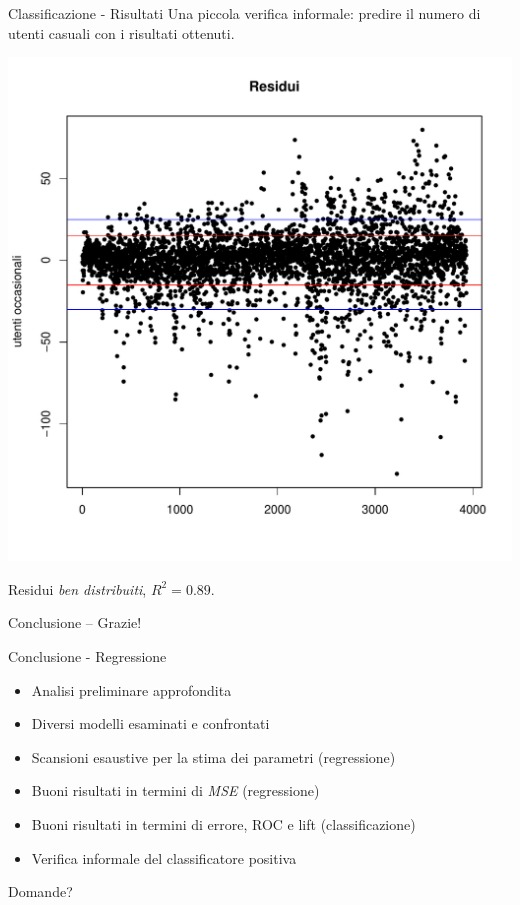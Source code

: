\documentclass{beamer}
\begin{document}
\begin{frame}{Classificazione - Risultati}
Una piccola verifica informale: predire il numero di utenti casuali
con i risultati ottenuti.

\begin{center}
  \includegraphics[height=0.5\textheight]{images/classification-residuals.pdf}
\end{center}

Residui \emph{ben distribuiti}, $R^{2} = 0.89$.
\end{frame}







\begin{frame}{Conclusione -- Grazie!}
\begin{block}{Conclusione - Regressione}
\begin{itemize}
  \item Analisi preliminare approfondita
  \item Diversi modelli esaminati e confrontati
  \item Scansioni esaustive per la stima dei parametri {\tiny (regressione)}
  \item Buoni risultati in termini di \emph{MSE} {\tiny (regressione)}
  \item Buoni risultati in termini di errore, ROC e lift {\tiny (classificazione)}
  \item Verifica informale del classificatore positiva
\end{itemize}
\end{block}

\begin{block}{Domande?}
\end{block}
\end{frame}
\end{document}
